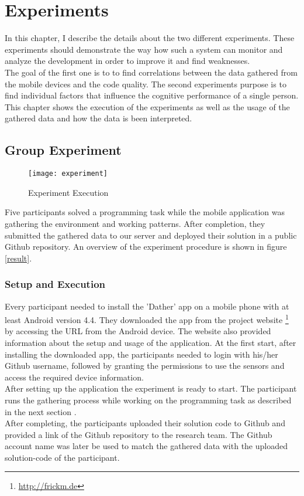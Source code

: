 \chapter{Experiments}
In this chapter, I describe the details about the two different experiments.
These experiments should demonstrate the way how such a system can monitor and analyze the development in order to improve it and find weaknesses.\\
The goal of the first one is to to find correlations between the data gathered from the mobile devices and the code quality. The second experiments purpose is to find individual factors that influence the cognitive performance of a single person. \\
This chapter shows the execution of the experiments as well as the usage of the gathered data and how the data is been interpreted. 

\section{Group Experiment}

\begin{figure}
\texttt{[image: experiment]}
\caption{Experiment Execution}\label{experiment}
\vspace{10 mm}
\end{figure}

Five participants solved a programming task while the mobile application was gathering the environment and working patterns. 
After completion, they submitted the gathered data to our server and deployed their solution in a public Github repository. 
An overview of the experiment procedure is shown in figure \ref{result}.
 
\subsection{Setup and Execution}
Every participant needed to install the 'Dather' app on a mobile phone with at least Android version 4.4.  
They downloaded the app from the project website \footnote{\url{http://frickm.de}} by accessing the URL from the Android device. The website also provided information about the setup and usage of the application. 
\bigbreak
At the first start, after installing the downloaded app, the participants needed to login with his/her Github username, followed by granting the permissions to use the sensors and access the required device information.\\
After setting up the application the experiment is ready to start. 
The participant runs the gathering process while working on the programming task as described in the next section .\\
After completing, the participants uploaded their solution code to Github and provided a link of the Github repository to the research team. The Github account name was later be used to match the gathered data with the uploaded solution-code of the participant. 

